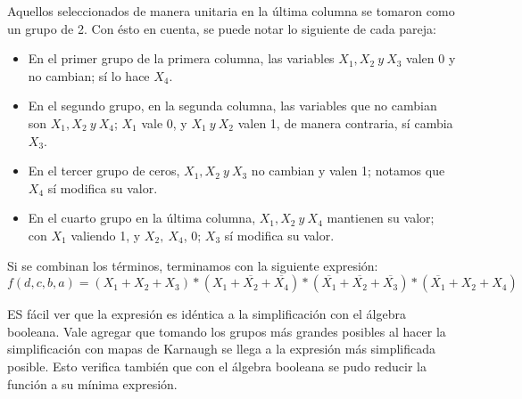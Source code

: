 Aquellos seleccionados de manera unitaria en la última columna se tomaron como un grupo de 2.
Con ésto en cuenta, se puede notar lo siguiente de cada pareja:
\begin{itemize}
    \item En el primer grupo de la primera columna, las variables \(X_1, X_2~y~X_3\) valen 0 y no cambian; sí lo hace \(X_4\).
    \item En el segundo grupo, en la segunda columna, las variables que no cambian son \(X_1, X_2~y~X_4\); \(X_1\) vale 0, y \(X_1~y~X_2 \) valen 1, de manera contraria, sí cambia \(X_3\).
    \item En el tercer grupo de ceros, $X_1, X_2~y~X_3$ no cambian y valen 1; notamos que \(X_4\) sí modifica su valor.
    \item En el cuarto grupo en la última columna, $X_1, X_2~y~X_4$ mantienen su valor; con \(X_1\) valiendo 1, y \(X_2,~X_4\), 0; \(X_3\) sí modifica su valor.
\end{itemize}
\vspace{5mm}


\vspace{5mm}
Si se combinan los términos, terminamos con la siguiente expresión:
\vspace{5mm}
\begin{dmath}
    f(d,c,b,a)={(X_{1}+X_{2}+X_{3})}*{(X_1+\overline{X_2}+\overline{X_4})}*{(\overline{X_1}+\overline{X_2}+\overline{X_3})}*{(\overline{X_1}+X_2+X_4)}
\end{dmath}
\vspace{5mm}

ES fácil ver que la expresión es idéntica a la simplificación con el álgebra booleana. Vale agregar que tomando los grupos más grandes posibles al hacer la simplificación con mapas de Karnaugh se llega a la expresión más simplificada posible. Esto verifica también que con el álgebra booleana se pudo reducir la función a su mínima expresión.


